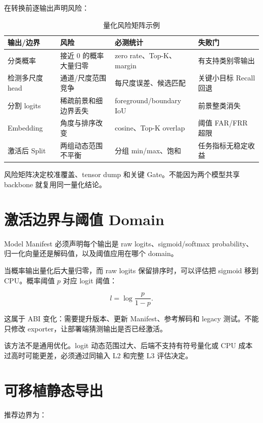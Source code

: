 在转换前逐输出声明风险：

\begin{table}[H]
  \centering
  \caption{量化风险矩阵示例}
  \begin{tabular}{p{26mm}p{35mm}p{36mm}p{34mm}}
    \hline
    输出/边界 & 风险 & 必测统计 & 失败门 \\
    \hline
    分类概率 & 接近 0 的概率大量归零 & zero rate、Top-K、margin & 有支持类别零输出 \\
    检测多尺度 head & 通道/尺度范围竞争 & 每尺度误差、候选匹配 & 关键小目标 Recall 回退 \\
    分割 logits & 稀疏前景和细边界丢失 & foreground/boundary IoU & 前景整类消失 \\
    Embedding & 角度与排序改变 & cosine、Top-K overlap & 阈值 FAR/FRR 超限 \\
    激活后 Split & 两组动态范围不平衡 & 分组 min/max、饱和 & 任务指标无稳定收益 \\
    \hline
  \end{tabular}
\end{table}

风险矩阵决定校准覆盖、tensor dump 和关键 Gate。不能因为两个模型共享 backbone 就复用同一量化结论。

\section{激活边界与阈值 Domain}

Model Manifest 必须声明每个输出是 raw logits、sigmoid/softmax probability、归一化向量还是解码值，以及阈值应用在哪个 domain。

当概率输出量化后大量归零，而 raw logits 保留排序时，可以评估把 sigmoid 移到 CPU。概率阈值 $p$ 对应 logit 阈值：

\begin{equation}
  l=\log\frac{p}{1-p}.
\end{equation}

这属于 ABI 变化：需要提升版本、更新 Manifest、参考解码和 legacy 测试。不能只修改 exporter，让部署端猜测输出是否已经激活。

该方法不是通用优化。logit 动态范围过大、后端不支持有符号量化或 CPU 成本过高时可能更差，必须通过同输入 L2 和完整 L3 评估决定。

\section{可移植静态导出}

推荐边界为：

